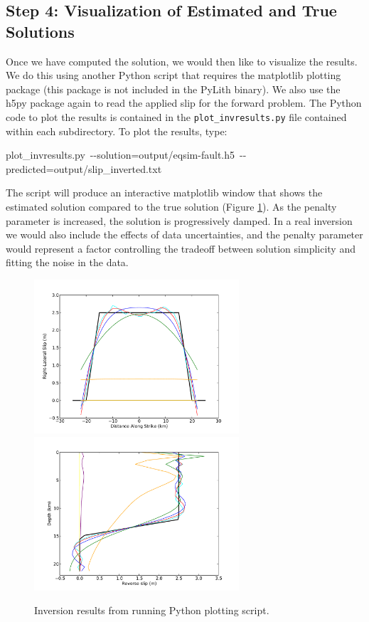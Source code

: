 \subsection{Step 4: Visualization of Estimated and True Solutions}

Once we have computed the solution, we would then like to visualize
the results. We do this using another Python script that requires
the matplotlib plotting package (this package is not included in the
PyLith binary). We also use the h5py package again to read the applied
slip for the forward problem. The Python code to plot the results
is contained in the \texttt{plot\_invresults.py} file contained within
each subdirectory. To plot the results, type:
\begin{lyxcode}
{\small{}plot\_invresults.py~-{}-solution=output/eqsim-fault.h5~-{}-predicted=output/slip\_inverted.txt}{\small \par}
\end{lyxcode}
The script will produce an interactive matplotlib window that shows
the estimated solution compared to the true solution (Figure \ref{fig:greensfns-invresults}).
As the penalty parameter is increased, the solution is progressively
damped. In a real inversion we would also include the effects of data
uncertainties, and the penalty parameter would represent a factor
controlling the tradeoff between solution simplicity and fitting the
noise in the data.

\noindent \begin{center}
\begin{figure}
\begin{centering}
\includegraphics[width=3in]{tutorials/greensfns2d/figs/strikeslip_inversion}\includegraphics[width=3in]{tutorials/greensfns2d/figs/reverse_inversion}
\par\end{centering}

\caption{Inversion results from running Python plotting script.\label{fig:greensfns-invresults}}
\end{figure}

\par\end{center}
